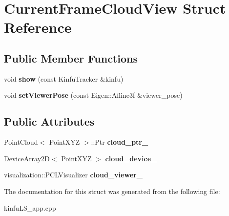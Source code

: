 \hypertarget{struct_current_frame_cloud_view}{\section{Current\+Frame\+Cloud\+View Struct Reference}
\label{struct_current_frame_cloud_view}
}
\subsection*{Public Member Functions}
\begin{DoxyCompactItemize}
\item 
\hypertarget{struct_current_frame_cloud_view_a37675023be58802a2ed85a9d303cbc4c}{void {\bfseries show} (const Kinfu\+Tracker \&kinfu)}\label{struct_current_frame_cloud_view_a37675023be58802a2ed85a9d303cbc4c}

\item 
\hypertarget{struct_current_frame_cloud_view_ab11efdc7199b5ece6c97f751540ea112}{void {\bfseries set\+Viewer\+Pose} (const Eigen\+::\+Affine3f \&viewer\+\_\+pose)}\label{struct_current_frame_cloud_view_ab11efdc7199b5ece6c97f751540ea112}

\end{DoxyCompactItemize}
\subsection*{Public Attributes}
\begin{DoxyCompactItemize}
\item 
\hypertarget{struct_current_frame_cloud_view_a0757823c686e57a61b5bdb971cd4a08f}{Point\+Cloud$<$ Point\+X\+Y\+Z $>$\+::Ptr {\bfseries cloud\+\_\+ptr\+\_\+}}\label{struct_current_frame_cloud_view_a0757823c686e57a61b5bdb971cd4a08f}

\item 
\hypertarget{struct_current_frame_cloud_view_aa5752e2eaaab9b80dbd2b0b55b21a1df}{Device\+Array2\+D$<$ Point\+X\+Y\+Z $>$ {\bfseries cloud\+\_\+device\+\_\+}}\label{struct_current_frame_cloud_view_aa5752e2eaaab9b80dbd2b0b55b21a1df}

\item 
\hypertarget{struct_current_frame_cloud_view_a6458fec62b13b09a6b6caa78c864e698}{visualization\+::\+P\+C\+L\+Visualizer {\bfseries cloud\+\_\+viewer\+\_\+}}\label{struct_current_frame_cloud_view_a6458fec62b13b09a6b6caa78c864e698}

\end{DoxyCompactItemize}


The documentation for this struct was generated from the following file\+:\begin{DoxyCompactItemize}
\item 
kinfu\+L\+S\+\_\+app.\+cpp\end{DoxyCompactItemize}
